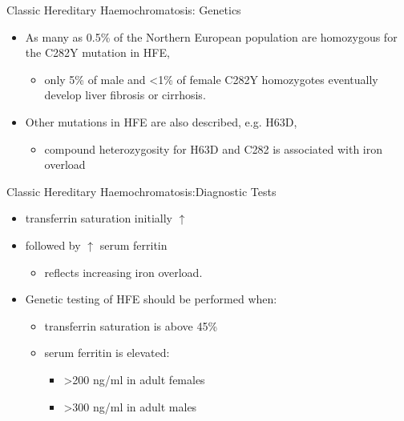 \documentclass[presentation, smaller]{beamer}
\begin{document}
\begin{frame}[label={sec:org0798f62}]{Classic Hereditary Haemochromatosis: Genetics}
\begin{itemize}
\item As many as 0.5\% of the Northern European population are homozygous
for the C282Y mutation in HFE,

\begin{itemize}
\item only 5\% of male and <1\% of female C282Y homozygotes eventually
develop liver fibrosis or cirrhosis.
\end{itemize}

\item Other mutations in HFE are also described, e.g. H63D,

\begin{itemize}
\item compound heterozygosity for H63D and C282 is associated with iron overload
\end{itemize}
\end{itemize}
\end{frame}

\begin{frame}[label={sec:org84ff796}]{Classic Hereditary Haemochromatosis:Diagnostic Tests}
\begin{itemize}
\item transferrin saturation initially \(\uparrow\)
\item followed by \(\uparrow\) serum ferritin
\begin{itemize}
\item reflects increasing iron overload.
\end{itemize}
\item Genetic testing of HFE should be performed when:
\begin{itemize}
\item transferrin saturation is above 45\%
\item serum ferritin is elevated:
\begin{itemize}
\item >200 ng/ml in adult females
\item >300 ng/ml in adult males
\end{itemize}
\end{itemize}
\end{itemize}
\end{frame}
\end{document}
